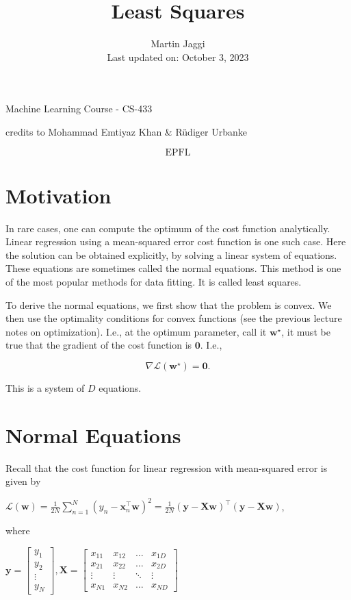 \documentclass[10pt]{article}
\title{Least Squares }
\author{Martin Jaggi\\
Last updated on: October 3, 2023}
\date{}
\begin{document}
\maketitle
Machine Learning Course - CS-433

credits to Mohammad Emtiyaz Khan \& Rüdiger Urbanke

$$
\text { EPFL }
$$

\section*{Motivation}
In rare cases, one can compute the optimum of the cost function analytically. Linear regression using a mean-squared error cost function is one such case. Here the solution can be obtained explicitly, by solving a linear system of equations. These equations are sometimes called the normal equations. This method is one of the most popular methods for data fitting. It is called least squares.

To derive the normal equations, we first show that the problem is convex. We then use the optimality conditions for convex functions (see the previous lecture notes on optimization). I.e., at the optimum parameter, call it $\mathbf{w}^{\star}$, it must be true that the gradient of the cost function is $\mathbf{0}$. I.e.,

$$
\nabla \mathcal{L}\left(\mathbf{w}^{\star}\right)=\mathbf{0} .
$$

This is a system of $D$ equations.

\section*{Normal Equations}
Recall that the cost function for linear regression with mean-squared error is given by

$\mathcal{L}(\mathbf{w})=\frac{1}{2 N} \sum_{n=1}^{N}\left(y_{n}-\mathbf{x}_{n}^{\top} \mathbf{w}\right)^{2}=\frac{1}{2 N}(\mathbf{y}-\mathbf{X} \mathbf{w})^{\top}(\mathbf{y}-\mathbf{X} \mathbf{w})$,

where

$\mathbf{y}=\left[\begin{array}{c}y_{1} \\ y_{2} \\ \vdots \\ y_{N}\end{array}\right], \mathbf{X}=\left[\begin{array}{cccc}x_{11} & x_{12} & \ldots & x_{1 D} \\ x_{21} & x_{22} & \ldots & x_{2 D} \\ \vdots & \vdots & \ddots & \vdots \\ x_{N 1} & x_{N 2} & \ldots & x_{N D}\end{array}\right]$
\end{document}

